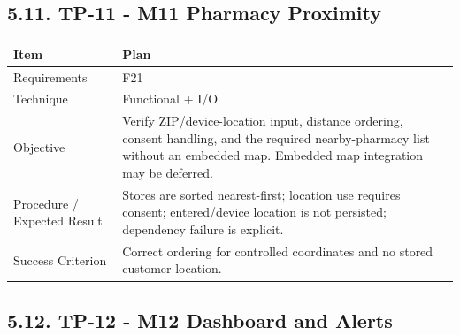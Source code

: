 \subsection{5.11. TP-11 - M11 Pharmacy Proximity}\label{tp-11---m11-pharmacy-proximity}

{\def\LTcaptype{none} %
\begin{longtable}[]{|
  >{\raggedright\arraybackslash}m{}|
  >{\raggedright\arraybackslash}m{}|}
\hline
\begin{minipage}[c]{\linewidth}\raggedright
\textbf{Item}
\end{minipage} & \begin{minipage}[c]{\linewidth}\raggedright
\textbf{Plan}
\end{minipage} \\
\hline
\endhead

\endlastfoot
Requirements & F21 \\ \hline
Technique & Functional + I/O \\ \hline
Objective & Verify ZIP/device-location input, distance ordering, consent handling, and the required nearby-pharmacy list without an embedded map. Embedded map integration may be deferred. \\ \hline
Procedure / Expected Result & Stores are sorted nearest-first; location use requires consent; entered/device location is not persisted; dependency failure is explicit. \\ \hline
Success Criterion & Correct ordering for controlled coordinates and no stored customer location. \\ \hline
\end{longtable}
}

\subsection{5.12. TP-12 - M12 Dashboard and Alerts}\label{tp-12---m12-dashboard-and-alerts}

